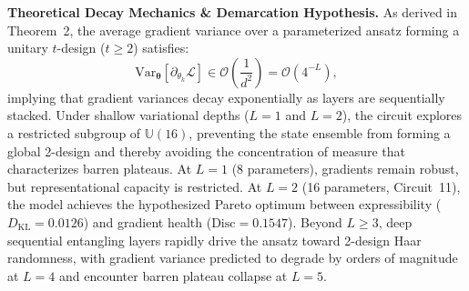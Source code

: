 \documentclass[pdflatex,sn-mathphys-num]{sn-jnl}%
\theoremstyle{thmstyleone}%
\theoremstyle{thmstyletwo}%
\theoremstyle{thmstylethree}%
\begin{document}
\textbf{Theoretical Decay Mechanics \& Demarcation Hypothesis.}
As derived in Theorem~2, the average gradient variance over a parameterized ansatz forming a unitary $t$-design ($t \ge 2$) satisfies:
\begin{equation}
\mathrm{Var}_{\boldsymbol{\theta}}\left[ \partial_{\theta_k} \mathcal{L} \right] \in \mathcal{O}\left( \frac{1}{d^2} \right) = \mathcal{O}\left( 4^{-L} \right),
\end{equation}
implying that gradient variances decay exponentially as layers are sequentially stacked. Under shallow variational depths ($L=1$ and $L=2$), the circuit explores a restricted subgroup of $\mathbb{U}(16)$, preventing the state ensemble from forming a global 2-design and thereby avoiding the concentration of measure that characterizes barren plateaus. At $L=1$ (8 parameters), gradients remain robust, but representational capacity is restricted. At $L=2$ (16 parameters, Circuit~11), the model achieves the hypothesized Pareto optimum between expressibility ($D_{\mathrm{KL}} = 0.0126$) and gradient health ($\mathrm{Disc} = 0.1547$). Beyond $L \ge 3$, deep sequential entangling layers rapidly drive the ansatz toward 2-design Haar randomness, with gradient variance predicted to degrade by orders of magnitude at $L=4$ and encounter barren plateau collapse at $L=5$.
\end{document}
